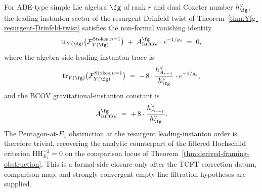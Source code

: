 \begin{theorem}
\label{thm:Yfg-non-formal-vanishing-leading}
For ADE-type simple Lie algebra $\fg$ of rank $r$ and dual Coxeter
number $h^\vee_\fg$, the leading instanton sector of the resurgent
Drinfeld twist of
Theorem~\ref{thm:Yfg-resurgent-Drinfeld-twist} satisfies the
non-formal vanishing identity
\[
 \mathrm{tr}_{Y(\fg)}\bigl(\mathcal{F}^{\mathrm{Stokes}, n = 1}_{Y(\fg)}\bigr)
 \;+\; A^{\fg}_{\mathrm{BCOV}} \cdot e^{-1/g_s}
 \;=\; 0,
\]
where the algebra-side leading-instanton trace is
\[
 \mathrm{tr}_{Y(\fg)}\bigl(\mathcal{F}^{\mathrm{Stokes}, n = 1}_{Y(\fg)}\bigr)
 \;=\; -\,8 \cdot \frac{h^\vee_{A_{r - 1}}}{h^\vee_\fg}
 \cdot e^{-1/g_s},
\]
and the BCOV gravitational-instanton constant is
\[
 A^{\fg}_{\mathrm{BCOV}}
 \;=\; +\,8 \cdot \frac{h^\vee_{A_{r - 1}}}{h^\vee_\fg}.
\]
The Pentagon-at-$E_1$ obstruction at the resurgent leading-instanton
order is therefore trivial, recovering the analytic counterpart of
the filtered Hochschild criterion
$\mathrm{HH}^{-2}_{E_1} = 0$ on the comparison locus of
Theorem~\ref{thm:derived-framing-obstruction}. This is a formal-side
closure only after the TCFT correction datum, comparison map, and
strongly convergent empty-line filtration hypotheses are supplied.
\end{theorem}

